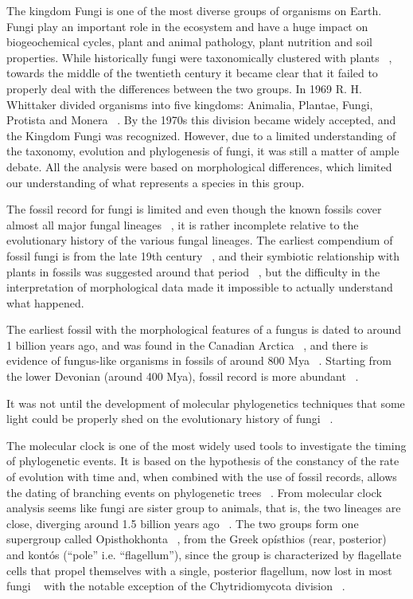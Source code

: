 The kingdom Fungi is one of the most diverse groups of organisms on Earth. Fungi play an important role in the ecosystem and have a huge impact on biogeochemical cycles, plant and animal pathology, plant nutrition and soil properties.
While historically fungi were taxonomically clustered with plants ~\citep{copeland1938, copeland1956}, towards the middle of the twentieth century it became clear that it failed to properly deal with the differences between the two groups. In 1969 R. H. Whittaker divided organisms into five kingdoms: Animalia, Plantae, Fungi, Protista and Monera ~\citep{whittaker1969}. By the 1970s this division became widely accepted, and the Kingdom Fungi was recognized.
However, due to a limited understanding of the taxonomy, evolution and phylogenesis of fungi, it was still a matter of ample debate. All the analysis were based on morphological differences, which limited our understanding of what represents a species in this group.

The fossil record for fungi is limited and even though the known fossils cover almost all major fungal lineages ~\citep{lucking2009}, it is rather incomplete relative to the evolutionary history of the various fungal lineages. The earliest compendium of fossil fungi is from the late 19th century ~\citep{meschinelli1898}, and their symbiotic relationship with plants in fossils was suggested around that period ~\citep{renault1896}, but the difficulty in the interpretation of morphological data made it impossible to actually understand what happened.

The earliest fossil with the morphological features of a fungus is dated to around 1 billion years ago, and was found in the Canadian Arctica ~\citep{loron2019}, and there is evidence of fungus-like organisms in fossils of around 800 Mya ~\citep{bonneville2020}.
Starting from the lower Devonian (around 400 Mya), fossil record is more abundant ~\citep{lucking2009}.

It was not until the development of molecular phylogenetics techniques that some light could be properly shed on the evolutionary history of fungi ~\citep{james2006}.

The molecular clock is one of the most widely used tools to investigate the timing of phylogenetic events. It is based on the hypothesis of the constancy of the rate of evolution with time and, when combined with the use of fossil records, allows the dating of branching events on phylogenetic trees ~\citep{lepage2007, weir2008}.
From molecular clock analysis seems like fungi are sister group to animals, that is, the two lineages are close, diverging around 1.5 billion years ago ~\citep{wang1999}. The two groups form one supergroup called Opisthokhonta ~\citep{cavalier-smith1987}, from the Greek opísthios (rear, posterior) and kontós (``pole'' i.e. ``flagellum''), since the group is characterized by flagellate cells that propel themselves with a single, posterior flagellum, now lost in most fungi ~\citep{steenkamp2006} with the notable exception of the Chytridiomycota division ~\citep{james2006a}.

